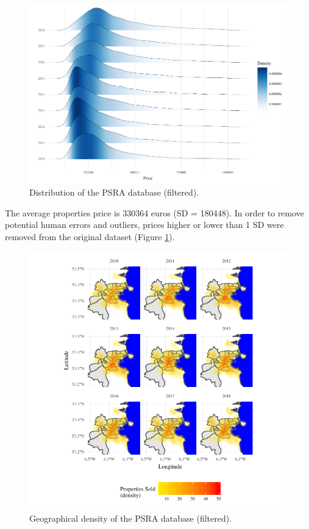 \documentclass[]{elsarticle} %
\begin{document}
\begin{figure}[H]

\includegraphics{property_price_paper_new_files/figure-latex/distrib-plot-1} \hfill{}

\caption{Distribution of the PSRA database (filtered).}\label{fig:distrib-plot}
\end{figure}

The average properties price is 330364 euros (SD = 180448). In order to
remove potential human errors and outliers, prices higher or lower than
1 SD were removed from the original dataset (Figure
\ref{fig:distrib-plot}).

\begin{figure}[H]

\includegraphics{property_price_paper_new_files/figure-latex/density-plot-1} \hfill{}

\caption{Geographical density of the PSRA database (filtered).}\label{fig:density-plot}
\end{figure}
\end{document}
